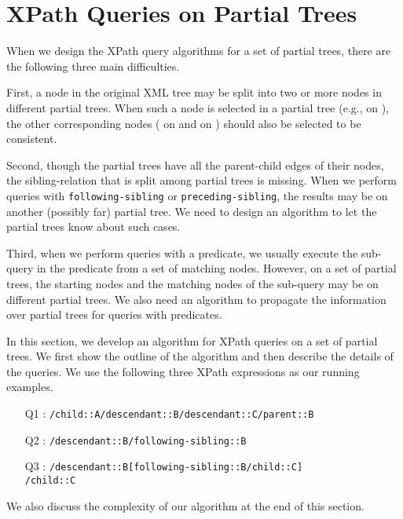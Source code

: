\section{XPath Queries on Partial Trees}

When we design the XPath query algorithms for a set of partial trees, there are the following three main difficulties.

First, a node in the original XML tree may be split into two or more nodes in different partial trees.
When such a node is selected in a partial tree (e.g.,  on ), the other corresponding nodes ( on  and  on ) should also be selected to be consistent.

Second, though the partial trees have all the parent-child edges of their nodes, 
the sibling-relation that is split among partial trees is missing.
When we perform queries with \texttt{following-sibling} or \texttt{preceding-sibling},
the results may be on another (possibly far) partial tree.
We need to design an algorithm to let the partial trees know about such cases.

Third, when we perform queries with a predicate, we usually execute the sub-query in the predicate
from a set of matching nodes.  However, on a set of partial trees, the starting nodes and the matching nodes 
of the sub-query may be on different partial trees.
We also need an algorithm to propagate the information over partial trees for queries with predicates.

In this section, we develop an algorithm for XPath queries on a set of partial trees.
We first show the outline of the algorithm and then describe the details of the queries.
We use the following three XPath expressions
as our running examples.
\begin{itemize}
\item [Q1]: \texttt{\small /child::A/descendant::B/descendant::C/parent::B}
\item [Q2]: \texttt{\small /descendant::B/following-sibling::B}
\item [Q3]: \texttt{\small /descendant::B[following-sibling::B/child::C]\\/child::C}
\end{itemize}
We also discuss the complexity of our algorithm at the end of this section.


